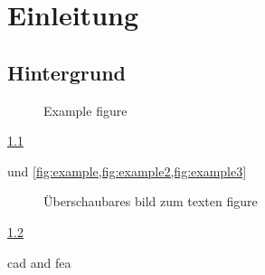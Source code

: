 
\chapter{Einleitung}
\section{Hintergrund}
\begin{figure}[ht]
  \centering
  \caption{Example figure}
  \label{fig:example} %
\end{figure}

\cref{fig:example}

\cite{xeinstein} und \cref{fig:example,fig:example2,fig:example3}

\begin{figure}[ht]
  \centering
  \caption{Überschaubares bild zum texten figure}
  \label{fig:example2} %
\end{figure}

\cref{fig:example2}

\ac{cad}
and \ac{fea}